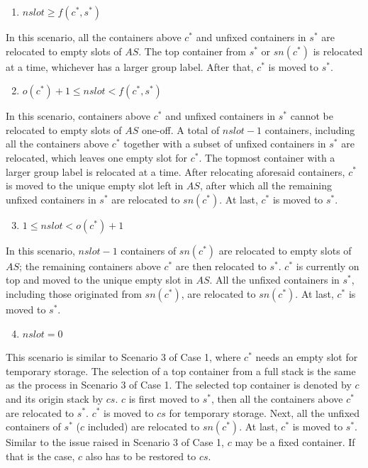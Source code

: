 \documentclass[review,3p,times,authoryear,12pt]{elsarticle}
\begin{document}
\begin{enumerate}
\setcounter{enumi}{0}
\item $\mathit{nslot}\ge f(c^*,s^*)$
\end{enumerate}

In this scenario, all the containers above $c^*$ and unfixed containers in $s^*$ are relocated to empty slots of $\mathit{AS}$. The top container from $s^*$ or $\mathit{sn}(c^*)$ is relocated at a time, whichever has a larger group label. After that, $c^*$ is moved to $s^*$.

\begin{enumerate}
\setcounter{enumi}{1}
\item $o(c^*)+1\le\mathit{nslot}< f(c^*,s^*)$
\end{enumerate}

In this scenario, containers above $c^*$ and unfixed containers in $s^*$ cannot be relocated to empty slots of $\mathit{AS}$ one-off.
A total of $\mathit{nslot}-1$ containers, including all the containers above $c^*$ together with a subset of unfixed containers in $s^*$ are relocated, which leaves one empty slot for $c^*$.
The topmost container with a larger group label is relocated at a time.
After relocating aforesaid containers, $c^*$ is moved to the unique empty slot left in $\mathit{AS}$, after which all the remaining unfixed containers in $s^*$ are relocated to $\mathit{sn}(c^*)$.
At last, $c^*$ is moved to $s^*$.

\begin{enumerate}
\setcounter{enumi}{2}
\item $1\le\mathit{nslot}< o(c^*)+1$
\end{enumerate}

In this scenario, $\mathit{nslot}-1$ containers of $\mathit{sn}(c^*)$ are relocated to empty slots of $\mathit{AS}$; the remaining containers above $c^*$ are then relocated to $s^*$.
$c^*$ is currently on top and moved to the unique empty slot in $\mathit{AS}$.
All the unfixed containers in $s^*$, including those originated from $\mathit{sn}(c^*)$, are relocated to $\mathit{sn}(c^*)$.
At last, $c^*$ is moved to $s^*$.

\begin{enumerate}
\setcounter{enumi}{3}
\item $\mathit{nslot}=0$
\end{enumerate}

This scenario is similar to Scenario 3 of Case 1, where $c^*$ needs an empty slot for temporary storage.
The selection of a top container from a full stack is the same as the process in Scenario 3 of Case 1.
The selected top container is denoted by $c$ and its origin stack by $\mathit{cs}$.
$c$ is first moved to $s^*$, then all the containers above $c^*$ are relocated to $s^*$.
$c^*$ is moved to $\mathit{cs}$ for temporary storage.
Next, all the unfixed containers of $s^*$ ($c$ included) are relocated to $\mathit{sn}(c^*)$.
At last, $c^*$ is moved to $s^*$.
Similar to the issue raised in Scenario 3 of Case 1, $c$ may be a fixed container.
If that is the case, $c$ also has to be restored to $\mathit{cs}$.
\end{document}
